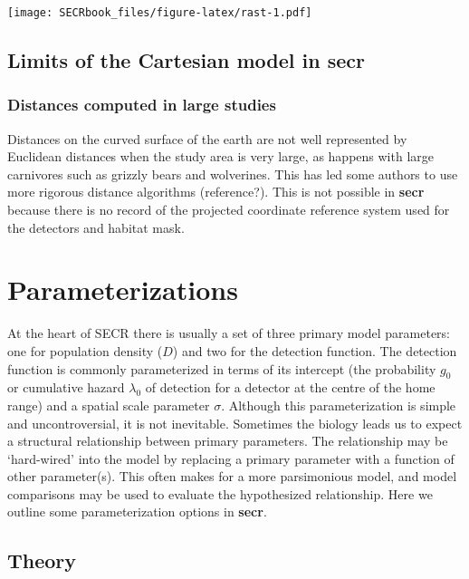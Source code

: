 \documentclass[
]{book}
\begin{document}
\texttt{[image: SECRbook\_files/figure-latex/rast-1.pdf]}

\section{\texorpdfstring{Limits of the Cartesian model in \textbf{secr}}{Limits of the Cartesian model in secr}}\label{limits-of-the-cartesian-model-in-secr}

\subsection{Distances computed in large studies}\label{distances-computed-in-large-studies}

Distances on the curved surface of the earth are not well represented by Euclidean distances when the study area is very large, as happens with large carnivores such as grizzly bears and wolverines. This has led some authors to use more rigorous distance algorithms (reference?). This is not possible in \textbf{secr} because there is no record of the projected coordinate reference system used for the detectors and habitat mask.

\chapter{Parameterizations}\label{parameterizations-1}


At the heart of SECR there is usually a set of three primary model parameters: one for population density (\(D\)) and two for the detection function. The detection function is commonly parameterized in terms of its intercept (the probability \(g_0\) or cumulative hazard \(\lambda_0\) of detection for a detector at the centre of the home range) and a spatial scale parameter \(\sigma\). Although this parameterization is simple and uncontroversial, it is not inevitable. Sometimes the
biology leads us to expect a structural relationship between primary parameters. The relationship may be `hard-wired' into the model by replacing a primary parameter with a function of other parameter(s). This often makes for a more parsimonious model, and model comparisons may be used to evaluate the hypothesized relationship. Here we outline some
parameterization options in \textbf{secr}.

\section{Theory}\label{theory}
\end{document}
